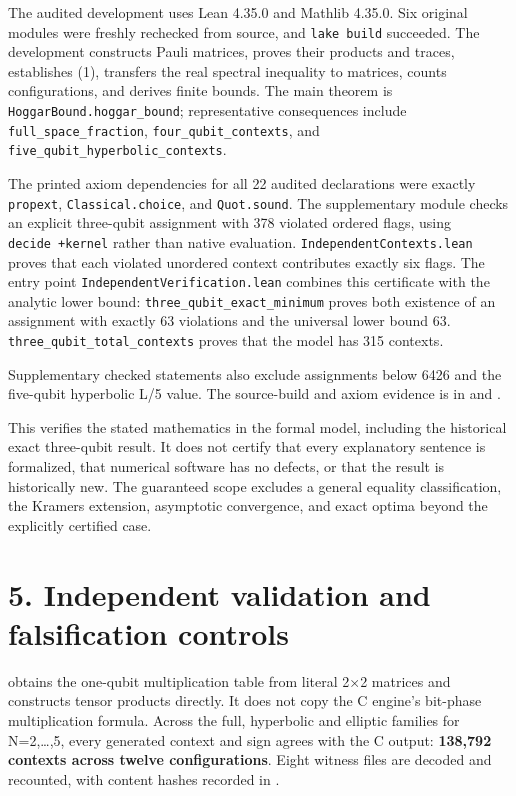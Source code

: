 \documentclass[11pt,letterpaper]{article}
\begin{document}
The audited development uses Lean 4.35.0 and Mathlib 4.35.0. Six original modules were freshly rechecked from source, and \texttt{lake\ build} succeeded. The development constructs Pauli matrices, proves their products and traces, establishes (1), transfers the real spectral inequality to matrices, counts configurations, and derives finite bounds. The main theorem is \texttt{HoggarBound.hoggar\_bound}; representative consequences include \texttt{full\_space\_fraction}, \texttt{four\_qubit\_contexts}, and \texttt{five\_qubit\_hyperbolic\_contexts}.

The printed axiom dependencies for all 22 audited declarations were exactly \texttt{propext}, \texttt{Classical.choice}, and \texttt{Quot.sound}. The supplementary module  checks an explicit three-qubit assignment with 378 violated ordered flags, using \texttt{decide\ +kernel} rather than native evaluation. \texttt{IndependentContexts.lean} proves that each violated unordered context contributes exactly six flags. The entry point \texttt{IndependentVerification.lean} combines this certificate with the analytic lower bound: \texttt{three\_qubit\_exact\_minimum} proves both existence of an assignment with exactly 63 violations and the universal lower bound 63. \texttt{three\_qubit\_total\_contexts} proves that the model has 315 contexts.

Supplementary checked statements also exclude assignments below 6426 and the five-qubit hyperbolic L/5 value. The source-build and axiom evidence is in  and .

This verifies the stated mathematics in the formal model, including the historical exact three-qubit result. It does not certify that every explanatory sentence is formalized, that numerical software has no defects, or that the result is historically new. The guaranteed scope excludes a general equality classification, the Kramers extension, asymptotic convergence, and exact optima beyond the explicitly certified case.

\section{5. Independent validation and falsification controls}\label{independent-validation-and-falsification-controls}

 obtains the one-qubit multiplication table from literal 2×2 matrices and constructs tensor products directly. It does not copy the C engine's bit-phase multiplication formula. Across the full, hyperbolic and elliptic families for N=2,\ldots,5, every generated context and sign agrees with the C output: \textbf{138,792 contexts across twelve configurations}. Eight witness files are decoded and recounted, with content hashes recorded in .
\end{document}
